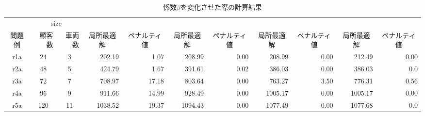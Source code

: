\begin{landscape}
  \begin{table}[]
  \caption{係数$\beta$を変化させた際の計算結果}
  \label{beta}
  \begin{tabular}{cllrrrrrrrr}
  \hline
  \multicolumn{1}{l}{} & \multicolumn{2}{c}{size}                          & \multicolumn{2}{c}{\beta=1}                               & \multicolumn{2}{c}{\beta=10}                              & \multicolumn{2}{c}{\beta=50}                              & \multicolumn{2}{c}{\beta=500}                             \\ \cline{2-11}
  問題例                  & \multicolumn{1}{r}{顧客数} & \multicolumn{1}{r}{車両数} & \multicolumn{1}{c}{局所最適解} & \multicolumn{1}{c}{ペナルティ値} & \multicolumn{1}{c}{局所最適解} & \multicolumn{1}{c}{ペナルティ値} & \multicolumn{1}{c}{局所最適解} & \multicolumn{1}{c}{ペナルティ値} & \multicolumn{1}{c}{局所最適解} & \multicolumn{1}{c}{ペナルティ値} \\ \cline{2-11}
  r1a                  & \multicolumn{1}{c}{24}  & \multicolumn{1}{c}{3}   & 202.19                        & 1.07                         & 208.99                       & 0.00                      & 208.99                        & 0.00                        & 212.49                        & 0.00                        \\
  r2a                  & \multicolumn{1}{c}{48}  & \multicolumn{1}{c}{5}   & 424.79                        & 1.67                        & 391.61                      & 0.02                        & 386.03                        & 0.00                        & 386.03                        & 0.0                         \\
  r3a                  & \multicolumn{1}{c}{72}  & \multicolumn{1}{c}{7}   & 708.97                        & 17.18                         & 803.64                        & 0.00                       & 763.27                        & 3.50                        & 776.31                        & 0.56                         \\
  r4a                  & \multicolumn{1}{c}{96}  & \multicolumn{1}{c}{9}   & 911.66                        & 14.99                      & 928.49                        & 0.00                        & 1005.17                       & 0.00                     & 1005.17                        & 0.00                        \\
  r5a                  & \multicolumn{1}{c}{120}  & \multicolumn{1}{c}{11}   & 1038.52                       & 19.37                      & 1094.43                        & 0.00                        & 1077.49                       & 0.00                        & 1077.68                        & 0.0                         \\

\end{tabular}
\end{table}
\end{landscape}
